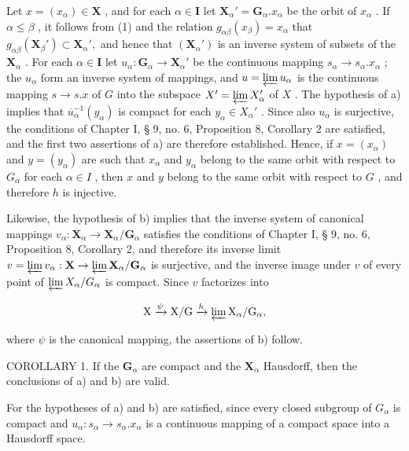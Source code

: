 Let \(x = (x_{\alpha}) \in \mathbf{X}\) , and for each \(\alpha \in \mathbf{I}\) let \(\mathbf{X}_{\alpha}' = \mathbf{G}_{\alpha}.x_{\alpha}\) be the orbit of \(x_{\alpha}\) . If \(\alpha \leqslant \beta\) , it follows from (1) and the relation \(g_{\alpha\beta}(x_{\beta}) = x_{\alpha}\) that \(g_{\alpha\beta}(\mathbf{X}_{\beta}') \subset \mathbf{X}_{\alpha}',\) and hence that \((\mathbf{X}_{\alpha}')\) is an inverse system of subsets of the \(\mathbf{X}_{\alpha}\) . For each \(\alpha \in \mathbf{I}\) let \(u_{\alpha}: \mathbf{G}_{\alpha} \to \mathbf{X}_{\alpha}'\) be the continuous mapping \(s_{\alpha} \to s_{\alpha}.x_{\alpha}\) ; the \(u_{\alpha}\) form an inverse system of mappings, and \(u = \varprojlim u_{\alpha}\) is the continuous mapping \(s \to s.x\) of \(G\) into the subspace \(X' = \varprojlim X_{\alpha}'\) of \(X\) . The hypothesis of a) implies that \(\overline{u}_{\alpha}^{-1}(y_{\alpha})\) is compact for each \(y_{\alpha} \in X_{\alpha}'\) . Since also \(u_{\alpha}\) is surjective, the conditions of Chapter I, § 9, no. 6, Proposition 8, Corollary 2 are satisfied, and the first two assertions of a) are therefore established. Hence, if \(x = (x_{\alpha})\) and \(y = (y_{\alpha})\) are such that \(x_{\alpha}\) and \(y_{\alpha}\) belong to the same orbit with respect to \(G_{\alpha}\) for each \(\alpha \in I\) , then \(x\) and \(y\) belong to the same orbit with respect to \(G\) , and therefore \(h\) is injective.

Likewise, the hypothesis of b) implies that the inverse system of canonical mappings \(v_{\alpha}: \mathbf{X}_{\alpha} \to \mathbf{X}_{\alpha}/\mathbf{G}_{\alpha}\) satisfies the conditions of Chapter I, § 9, no. 6, Proposition 8, Corollary 2, and therefore its inverse limit \(v = \varprojlim v_{\alpha}: \mathbf{X} \to \varprojlim \mathbf{X}_{\alpha}/\mathbf{G}_{\alpha}\) is surjective, and the inverse image under \(v\) of every point of \(\varprojlim X_{\alpha}/G_{\alpha}\) is compact. Since \(v\) factorizes into

\[
\mathrm{X} \xrightarrow {\psi} \mathrm{X} / \mathrm{G} \xrightarrow {h} \varprojlim \mathrm{X} _ {\alpha} / \mathrm{G} _ {\alpha},
\]

where \(\psi\) is the canonical mapping, the assertions of b) follow.

COROLLARY 1. If the \(\mathbf{G}_{\alpha}\) are compact and the \(\mathbf{X}_{\alpha}\) Hausdorff, then the conclusions of a) and b) are valid.

For the hypotheses of a) and b) are satisfied, since every closed subgroup of \(G_{\alpha}\) is compact and \(u_{\alpha}: s_{\alpha} \to s_{\alpha}.x_{\alpha}\) is a continuous mapping of a compact space into a Hausdorff space.

